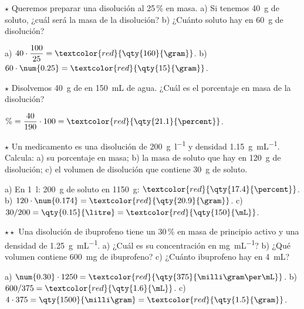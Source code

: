 \begin{exercise}
    \(\star\) Queremos preparar una disolución al 25\,\% en masa. a) Si tenemos \qty{40}{\gram} de soluto, ¿cuál será la masa de
    la disolución? b) ¿Cuánto soluto hay en \qty{60}{\gram} de disolución?
    \begin{solu}
        a) \(40 \cdot \dfrac{100}{25} = \textcolor{red}{\qty{160}{\gram}}\). b) \(60 \cdot \num{0.25} = \textcolor{red}{\qty{15}{\gram}}\).
    \end{solu}
\end{exercise}

\begin{exercise}
    \(\star\) Disolvemos \qty{40}{\gram} de  en \qty{150}{\mL} de agua. ¿Cuál es el porcentaje en masa de la disolución?
    \begin{solu}
        \(\% = \dfrac{40}{190} \cdot 100 = \textcolor{red}{\qty{21.1}{\percent}}\).
    \end{solu}
\end{exercise}

\begin{exercise}
    \(\star\) Un medicamento es una disolución de \qty{200}{\gram\per\litre} y densidad \qty{1.15}{\gram\per\mL}. Calcula: a) su
    porcentaje en masa; b) la masa de soluto que hay en \qty{120}{\gram} de disolución; c) el volumen de disolución que contiene
    \qty{30}{\gram} de soluto.
    \begin{solu}
        a) En \qty{1}{\litre}: \qty{200}{\gram} de soluto en \qty{1150}{\gram}: \(\textcolor{red}{\qty{17.4}{\percent}}\).
        b) \(120 \cdot \num{0.174} = \textcolor{red}{\qty{20.9}{\gram}}\). c) \(30/200 = \qty{0.15}{\litre} = \textcolor{red}{\qty{150}{\mL}}\).
    \end{solu}
\end{exercise}

\begin{exercise}
    \(\star\star\) Una disolución de ibuprofeno tiene un 30\,\% en masa de principio activo y una densidad de
    \qty{1.25}{\gram\per\mL}. a) ¿Cuál es su concentración en \unit{\milli\gram\per\mL}? b) ¿Qué volumen contiene
    \qty{600}{\milli\gram} de ibuprofeno? c) ¿Cuánto ibuprofeno hay en \qty{4}{\mL}?
    \begin{solu}
        a) \(\num{0.30} \cdot 1250 = \textcolor{red}{\qty{375}{\milli\gram\per\mL}}\). b) \(600/375 = \textcolor{red}{\qty{1.6}{\mL}}\).
        c) \(4 \cdot 375 = \qty{1500}{\milli\gram} = \textcolor{red}{\qty{1.5}{\gram}}\).
    \end{solu}
\end{exercise}

